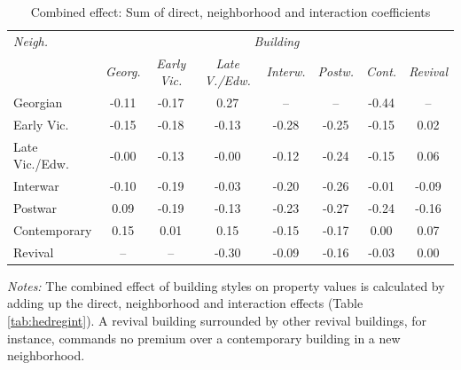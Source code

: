 \documentclass[]{article}
\begin{document}
\newpage

\begin{table}[ht]
\centering
\caption{Combined effect: Sum of direct, neighborhood and interaction coefficients}
\label{tab:comb}
\begin{tabular}{lccccccc}
\toprule
\emph{Neigh.} & \multicolumn{7}{c}{\emph{Building}} \\
 \cmidrule(lr){1-1}
 \cmidrule(lr){2-8}
& \emph{Georg.} & \emph{Early Vic.} & \emph{Late V./Edw.} & \emph{Interw.} & \emph{Postw.} & \emph{Cont.} & \emph{Revival} \\ 
  \cmidrule(lr){2-8}
Georgian & -0.11 & -0.17 & 0.27 & -- &--  & -0.44 &--  \\ 
  Early Vic. & -0.15 & -0.18 & -0.13 & -0.28 & -0.25 & -0.15 & 0.02 \\ 
  Late Vic./Edw. & -0.00 & -0.13 & -0.00 & -0.12 & -0.24 & -0.15 & 0.06 \\ 
  Interwar & -0.10 & -0.19 & -0.03 & -0.20 & -0.26 & -0.01 & -0.09 \\ 
  Postwar & 0.09 & -0.19 & -0.13 & -0.23 & -0.27 & -0.24 & -0.16 \\ 
  Contemporary & 0.15 & 0.01 & 0.15 & -0.15 & -0.17 & 0.00 & 0.07 \\ 
  Revival & -- & -- & -0.30 & -0.09 & -0.16 & -0.03 & 0.00 \\ 
\bottomrule
\end{tabular}
\begin{minipage}{\textwidth}
\vspace{0.25cm}
\footnotesize \emph{Notes:} The combined effect of building styles on property values is calculated by adding up the direct, neighborhood and interaction effects (Table \ref{tab:hedregint}). A revival building surrounded by other revival buildings, for instance, commands no premium over a contemporary building in a new neighborhood.
\end{minipage}
\end{table}

\clearpage

\printbibliography[title=Bibliography]
\end{document}

